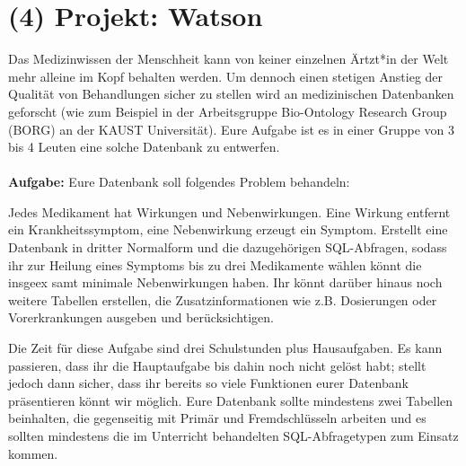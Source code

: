 \documentclass[]{article}
\begin{document}
\newpage

\section*{(4) Projekt: Watson}

Das Medizinwissen der Menschheit kann von keiner einzelnen Ärtzt*in der Welt mehr alleine im Kopf behalten werden. Um dennoch einen stetigen Anstieg der Qualität von Behandlungen sicher zu stellen wird an medizinischen Datenbanken geforscht (wie zum Beispiel in der Arbeitsgruppe Bio-Ontology Research Group (BORG) an der KAUST Universität). Eure Aufgabe ist es in einer Gruppe von 3 bis 4 Leuten eine solche Datenbank zu entwerfen. \\\ \\


\textbf{Aufgabe:} Eure Datenbank soll folgendes Problem behandeln:

Jedes Medikament hat Wirkungen und Nebenwirkungen. Eine Wirkung entfernt ein Krankheitssymptom, eine Nebenwirkung erzeugt ein Symptom. Erstellt eine Datenbank in dritter Normalform und die dazugehörigen SQL-Abfragen, sodass ihr zur Heilung eines Symptoms bis zu drei Medikamente wählen könnt die insgeex
samt minimale Nebenwirkungen haben. Ihr könnt darüber hinaus noch weitere Tabellen erstellen, die Zusatzinformationen wie z.B. Dosierungen oder Vorerkrankungen ausgeben und berücksichtigen. 

Die Zeit für diese Aufgabe sind drei Schulstunden plus Hausaufgaben. Es kann passieren, dass ihr die Hauptaufgabe bis dahin noch nicht gelöst habt; stellt jedoch dann sicher, dass ihr bereits so viele Funktionen eurer Datenbank präsentieren könnt wir möglich. Eure Datenbank sollte mindestens zwei Tabellen beinhalten, die gegenseitig mit Primär und Fremdschlüsseln arbeiten und es sollten mindestens die im Unterricht behandelten SQL-Abfragetypen zum Einsatz kommen. 
\end{document}
